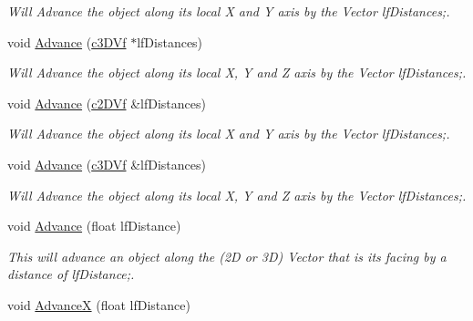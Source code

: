 \begin{DoxyCompactItemize}
\begin{DoxyCompactList}\small\item\em Will Advance the object along its local X and Y axis by the Vector lfDistances;. \end{DoxyCompactList}\item 
\hypertarget{classc_matrix4_a86aefa3a444eaabd4ad1a66e4857f40e}{
void \hyperlink{classc_matrix4_a86aefa3a444eaabd4ad1a66e4857f40e}{Advance} (\hyperlink{classc3_d_vf}{c3DVf} $\ast$lfDistances)}
\label{classc_matrix4_a86aefa3a444eaabd4ad1a66e4857f40e}

\begin{DoxyCompactList}\small\item\em Will Advance the object along its local X, Y and Z axis by the Vector lfDistances;. \end{DoxyCompactList}\item 
\hypertarget{classc_matrix4_a07d410e6592dacf244ad118d70443181}{
void \hyperlink{classc_matrix4_a07d410e6592dacf244ad118d70443181}{Advance} (\hyperlink{classc2_d_vf}{c2DVf} \&lfDistances)}
\label{classc_matrix4_a07d410e6592dacf244ad118d70443181}

\begin{DoxyCompactList}\small\item\em Will Advance the object along its local X and Y axis by the Vector lfDistances;. \end{DoxyCompactList}\item 
\hypertarget{classc_matrix4_ac07dd71793d6df522efa2098f9e1daa6}{
void \hyperlink{classc_matrix4_ac07dd71793d6df522efa2098f9e1daa6}{Advance} (\hyperlink{classc3_d_vf}{c3DVf} \&lfDistances)}
\label{classc_matrix4_ac07dd71793d6df522efa2098f9e1daa6}

\begin{DoxyCompactList}\small\item\em Will Advance the object along its local X, Y and Z axis by the Vector lfDistances;. \end{DoxyCompactList}\item 
\hypertarget{classc_matrix4_ad0744229e75d1053c3a2e4bcfe8dc46f}{
void \hyperlink{classc_matrix4_ad0744229e75d1053c3a2e4bcfe8dc46f}{Advance} (float lfDistance)}
\label{classc_matrix4_ad0744229e75d1053c3a2e4bcfe8dc46f}

\begin{DoxyCompactList}\small\item\em This will advance an object along the (2D or 3D) Vector that is its facing by a distance of lfDistance;. \end{DoxyCompactList}\item 
\hypertarget{classc_matrix4_aa23f7d55e4eddcba673f8a6e44f63c3e}{
void \hyperlink{classc_matrix4_aa23f7d55e4eddcba673f8a6e44f63c3e}{AdvanceX} (float lfDistance)}
\label{classc_matrix4_aa23f7d55e4eddcba673f8a6e44f63c3e}


\end{DoxyCompactItemize}
